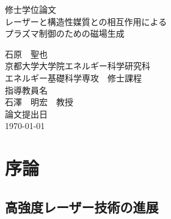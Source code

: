 \documentclass[a4paper,11pt,titlepage]{jarticle}
\numberwithin{equation}{section} %
\begin{document}
{\begin{titlepage}

    \huge
    \begin{center}
        修士学位論文\\
        \vspace{20mm}
        レーザーと構造性媒質との相互作用による\\
        プラズマ制御のための磁場生成
        \vspace{20mm}

    \LARGE

        石原　聖也\\

    \Large
        \vspace{20mm}
        京都大学大学院エネルギー科学研究科\\
        エネルギー基礎科学専攻　修士課程\\
        \vspace{20mm}
        指導教員名\\
        石澤　明宏　教授\\    
        \vspace{20mm}
        論文提出日\\    
        {\today}\par
    \end{center}

\end{titlepage}}

\newpage
\normalsize  
\tableofcontents
\newpage

\section{序論}
\subsection{高強度レーザー技術の進展}
\end{document}
